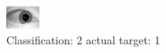 \begin{figure}[h!]
\begin{center}
\includegraphics[width=0.60\columnwidth]{figures/ID1478_class_2_target_1.png}
\end{center}
\caption{ Classification: 2 actual target: 1}
\label{fig:ID1478_class_2_target_1}
\end{figure}
